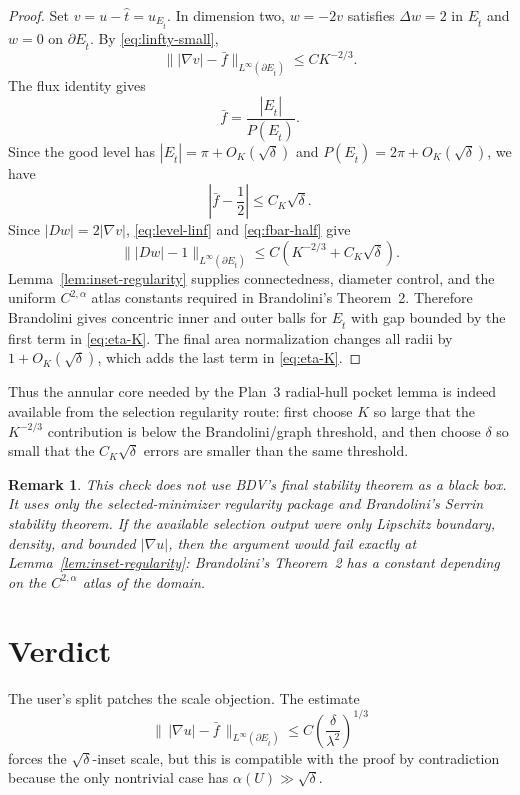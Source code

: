 \documentclass[11pt]{article}
\newtheorem{remark}[theorem]{Remark}
\begin{document}
\begin{proof}
Set \(v=u-\hat t=u_{E_{\hat t}}\).  In dimension two, \(w=-2v\) satisfies
\(\Delta w=2\) in \(E_{\hat t}\) and \(w=0\) on \(\partial E_{\hat t}\).
By \eqref{eq:linfty-small},
\[
   \bigl\||\nabla v|-\bar f\bigr\|_{L^\infty(\partial E_{\hat t})}
      \le C K^{-2/3}.
   \tag{9.6}\label{eq:level-linf}
\]
The flux identity gives
\[
   \bar f=\frac{|E_{\hat t}|}{P(E_{\hat t})}.
   \tag{9.7}
\]
Since the good level has \(|E_{\hat t}|=\pi+O_K(\sqrt\delta)\) and
\(P(E_{\hat t})=2\pi+O_K(\sqrt\delta)\), we have
\[
   \left|\bar f-\frac12\right|\le C_K\sqrt\delta.
   \tag{9.8}\label{eq:fbar-half}
\]
Since \(|Dw|=2|\nabla v|\), \eqref{eq:level-linf} and
\eqref{eq:fbar-half} give
\[
   \bigl\||Dw|-1\bigr\|_{L^\infty(\partial E_{\hat t})}
      \le C\left(K^{-2/3}+C_K\sqrt\delta\right).
   \tag{9.9}
\]
Lemma~\ref{lem:inset-regularity} supplies connectedness, diameter control,
and the uniform \(C^{2,\alpha}\) atlas constants required in Brandolini's
Theorem~2.  Therefore Brandolini gives concentric inner and outer balls for
\(E_{\hat t}\) with gap bounded by the first term in \eqref{eq:eta-K}.  The
final area normalization changes all radii by \(1+O_K(\sqrt\delta)\), which
adds the last term in \eqref{eq:eta-K}.
\end{proof}

Thus the annular core needed by the Plan~3 radial-hull pocket lemma is indeed
available from the selection regularity route: first choose \(K\) so large
that the \(K^{-2/3}\) contribution is below the Brandolini/graph threshold,
and then choose \(\delta\) so small that the \(C_K\sqrt\delta\) errors are
smaller than the same threshold.

\begin{remark}
This check does not use BDV's final stability theorem as a black box.  It uses
only the selected-minimizer regularity package and Brandolini's Serrin
stability theorem.  If the available selection output were only Lipschitz
boundary, density, and bounded \(|\nabla u|\), then the argument would fail
exactly at Lemma~\ref{lem:inset-regularity}: Brandolini's Theorem~2 has a
constant depending on the \(C^{2,\alpha}\) atlas of the domain.
\end{remark}

\section{Verdict}

The user's split patches the scale objection.  The estimate
\[
   \|\,|\nabla u|-\bar f\,\|_{L^\infty(\partial E_{\hat t})}
      \le
      C\left(\frac{\delta}{\lambda^2}\right)^{1/3}
\]
forces the \(\sqrt\delta\)-inset scale, but this is compatible with the
proof by contradiction because the only nontrivial case has
\(\alpha(U)\gg\sqrt\delta\).
\end{document}
